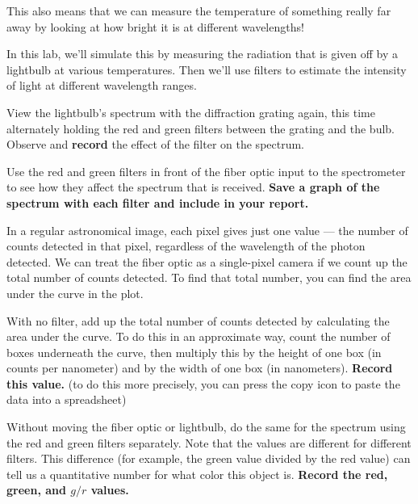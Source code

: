 \noindent
{}
\hspace{0.3cm}
\vspace{0.2cm}
\begin{minipage}{0.5\textwidth}
This also means that we can measure the temperature of something really far
away by looking at how bright it is at different wavelengths!

In this lab, we'll simulate this by measuring the radiation that is given off
by a lightbulb at various temperatures.  Then we'll use filters to estimate the
intensity of light at different wavelength ranges.
\end{minipage}
\begin{steps}
	\item View the lightbulb's spectrum with the diffraction grating again, this time alternately holding the red and green filters between the grating and the bulb. Observe and \textbf{record} the effect of the filter on the spectrum.
	
	\item Use the red and green filters in front of the fiber optic input to the spectrometer to see how they affect the spectrum that is received. \textbf{Save a graph of the spectrum with each filter and include in your report.}
\end{steps}

In a regular astronomical image, each pixel gives just one value --- the number of counts detected in that pixel, regardless of the wavelength of the photon detected. We can treat the fiber optic as a single-pixel camera if we count up the total number of counts detected. To find that total number, you can find the area under the curve in the plot.

\begin{steps}
	\item With no filter, add up the total number of counts detected by calculating the area under the curve. To do this in an approximate way, count the number of boxes underneath the curve, then multiply this by the height of one box (in counts per nanometer) and by the width of one box (in nanometers). \textbf{Record this value.} (to do this more precisely, you can press the copy icon to paste the data into a spreadsheet)
	
	\item Without moving the fiber optic or lightbulb, do the same for the spectrum using the red and green filters separately. Note that the values are different for different filters. This difference (for example, the green value divided by the red value) can tell us a quantitative number for what color this object is. \textbf{Record the red, green, and $g/r$ values.}
\end{steps}

